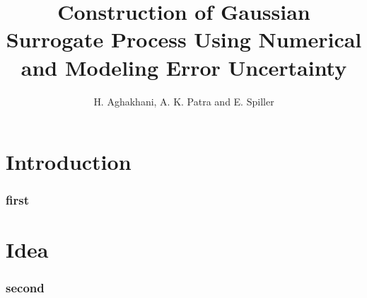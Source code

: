 \documentclass[10pt,a4paper]{beamer}
\author{H. Aghakhani, A. K. Patra and
E. Spiller}
\title{Construction of Gaussian
Surrogate Process Using Numerical
and Modeling Error Uncertainty}
\begin{document}
\frame{\titlepage} 

\section{Introduction} 
\begin{frame} 
\frametitle{first}
\end{frame}

\section{Idea} 
\begin{frame} 
\frametitle{second}
\end{frame}
\end{document}
